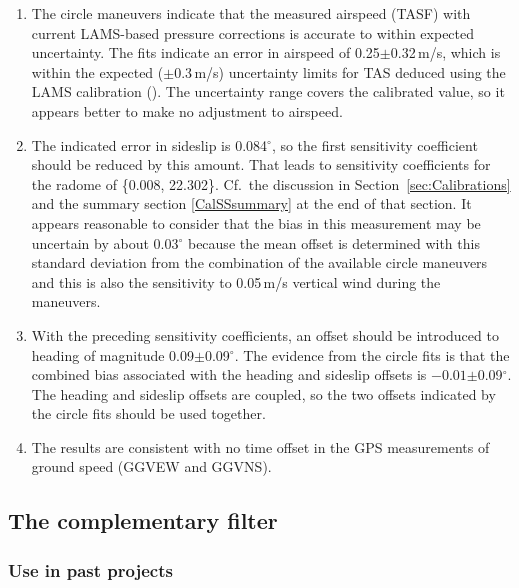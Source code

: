 \documentclass[12pt,twoside,english]{article}\usepackage[]{graphicx}\usepackage[]{color}
\let\OrgIndex\index
\renewcommand*{\index}[1]{\OrgIndex{#1}}
\begin{document}
{{\begin{enumerate}
\item The circle maneuvers indicate that the measured airspeed (TASF) with current LAMS-based pressure corrections is accurate to within expected uncertainty. The fits indicate an error in airspeed 
of 0.25$\pm$0.32\,m/s,%
which is within the expected ($\pm$0.3\,m/s) uncertainty limits for TAS deduced using the LAMS calibration (\citet{CooperEtAl2014}). The uncertainty range covers the calibrated value, so it appears better to make no adjustment to airspeed.  
\item The indicated error in sideslip is 0.084$^{\circ}$, so the first sensitivity coefficient should be reduced by this amount. That leads to sensitivity coefficients for the radome of  \{0.008, 22.302\}. Cf.\ the discussion in Section\ \ref{sec:Calibrations} and the summary section \ref{CalSSsummary} at the end of that section. It appears reasonable to consider that the bias in this measurement may be uncertain by about 0.03$^{\circ}$ because the mean offset is determined with this standard deviation from the combination of the available circle maneuvers and this is also the sensitivity to 0.05\,m/s vertical wind during the maneuvers. 
\item With the preceding sensitivity coefficients, an offset should be introduced to heading of magnitude 
0.09$\pm$0.09$^{\circ}$. 
The evidence from the circle fits is that the combined bias associated with the heading and sideslip offsets is \ensuremath{-0.01}$\pm$0.09$^{\circ}$. 
The heading and sideslip offsets are coupled, so the two offsets indicated by the circle fits should be used together.  
\item The results are consistent with no time offset in the GPS measurements of ground speed (GGVEW and GGVNS). 
\end{enumerate}

\vfill\eject



\subsection{The complementary filter\label{sub:comp-filter}}

\subsubsection{Use in past projects}

}}
\end{document}
